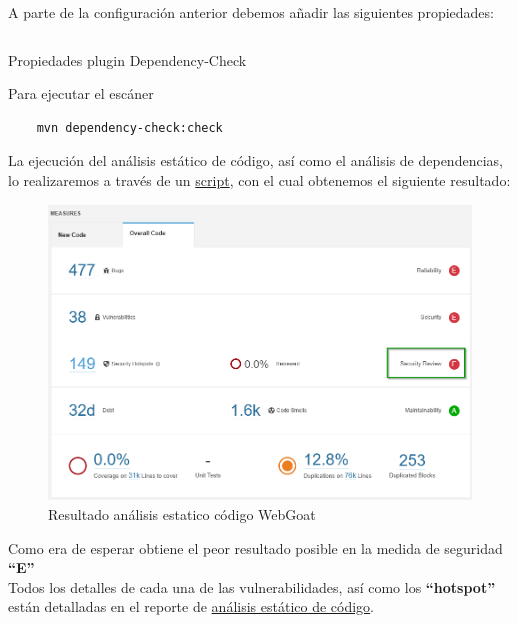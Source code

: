 A parte de la configuración anterior debemos añadir las siguientes propiedades:\\

\begin{listing}[h]
    \inputminted{xml}{./Ficheros/ConfigPropertiesPlugin_maven.xml}
    \caption{Propiedades plugin Dependency-Check}
    \label{listing:5}
\end{listing}

Para ejecutar el escáner\\

\begin{verbatim}
    mvn dependency-check:check
\end{verbatim}

\newpage
La ejecución del análisis estático de código, así como el análisis de dependencias, lo realizaremos a través de un 
\href{https://github.com/M0l1n3ta/PFG/blob/master/Scripts/STAT/RunSonarScaner_WebGoat.ps1}{script}, con el cual
obtenemos el siguiente resultado:\\

\begin{figure}[htb] 
    \captionsetup{width=1\linewidth}   
    \includegraphics[width=\linewidth]{./imagenes/09_AnalisisEstatico_WebGoat.png}
    \caption{Resultado análisis estatico código WebGoat}  
    \label{fig:25}
\end{figure}

Como era de esperar obtiene el peor resultado posible en la medida de seguridad \textbf{“E”}\\

Todos los detalles de cada una de las vulnerabilidades, así como los \textbf{“hotspot”} están detalladas en el reporte de 
\href{https://github.com/M0l1n3ta/PFG/blob/master/Reportes/An%C3%A1lisis estatico de c%C3%B3digo/ReporteAnalisisestatico_WebGoat.docx}{análisis estático de código}.\\

